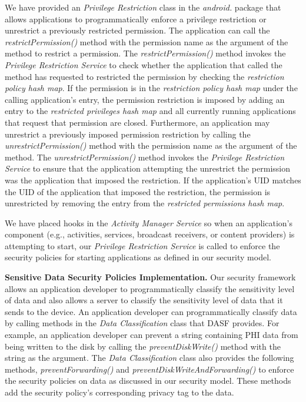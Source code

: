 We have provided an \textit{Privilege Restriction} class in the
\textit{android.} package that allows applications to programmatically
enforce a privilege restriction or unrestrict a previously restricted
permission.  The application can call the \textit{restrictPermission()}
method with the permission name as the argument of the method to restrict
a permission.  The \textit{restrictPermission()} method invokes
the \textit{Privilege Restriction Service} to check whether the
application that called the method has requested to restricted the permission
by checking the \textit{restriction policy hash map}.  If the permission
is in the \textit{restriction policy hash map} under the calling application's
entry, the permission restriction is imposed by adding an entry
to the \textit{restricted privileges hash map} and all currently running
applications that request that permission are closed.  Furthermore,
an application may unrestrict a previously imposed permission restriction
by calling the \textit{unrestrictPermission()} method with the permission
name as the argument of the method.  The \textit{unrestrictPermission()}
method invokes the \textit{Privilege Restriction Service} to ensure
that the application attempting the unrestrict the permission was
the application that imposed the restriction.  If the application's
UID matches the UID of the application that imposed the restriction,
the permission is unrestricted by removing the entry from the
\textit{restricted permissions hash map}.

We have placed hooks in the \textit{Activity Manager Service} so when 
an application's component (e.g., activities, services, broadcast receivers,
or content providers) is attempting to start, our \textit{Privilege Restriction
 Service} is called to enforce the security policies for starting applications
as defined in our security model.

\textbf{Sensitive Data Security Policies Implementation.}  Our
security framework allows an application developer to programmatically
classify the sensitivity level of data and also allows a server
to classify the sensitivity level of data that it sends to the device.
An application developer can programmatically classify data by calling
methods in the \textit{Data Classification} class that DASF
provides. For example, an application developer can prevent a string
containing PHI data from being written to the disk by calling the
\textit{preventDiskWrite()} method with the string as the argument.
The \textit{Data Classification} class also provides the following
methods, \textit{preventForwarding()} and
\textit{preventDiskWriteAndForwarding()} to enforce the
security policies on data as discussed in our security model.
These methods add the security policy's corresponding
privacy tag to the data.

